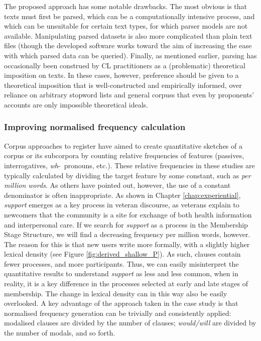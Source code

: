 The proposed approach has some notable drawbacks. The most obvious is that texts must first be parsed, which can be a computationally intensive process, and which can be unsuitable for certain text types, for which parser models are not available. Manipulating parsed datasets is also more complicated than plain text files (though the developed software works toward the aim of increasing the ease with which parsed data can be queried). Finally, as mentioned earlier, parsing has occasionally been construed by \gls{CL} practitioners as a (problematic) theoretical imposition on texts. In these cases, however, preference should be given to a theoretical imposition that is well\hyp{}constructed and empirically informed, over reliance on arbitrary stopword lists and general \glspl{corpus} that even by proponents' accounts \cite[e.g.][]{baker_acceptable_2012} are only impossible theoretical ideals.

\subsubsection{Improving normalised frequency calculation}


Corpus approaches to register \cite[including much of Biber's work, e.g.][]{biber_quantitative_2001,biber_register_2012} have aimed to create quantitative sketches of a \gls{corpus} or its subcorpora by counting relative frequencies of  features (passives, interrogatives, \emph{wh}\hyp{}~pronouns, etc.). These relative frequencies in these studies are typically calculated by dividing the target feature by some constant, such as \emph{per million words}. As others \cite[e.g.][]{evert2005statistics} have pointed out, however, the use of a constant denominator is often inappropriate. As shown in Chapter \ref{chap:experiential}, \emph{support} emerges as a key process in veteran discourse, as veterans explain to newcomers that the community is a site for exchange of both health information and interpersonal care. If we search for \emph{support} as a process in the Membership Stage Structure, we will find a decreasing frequency per million words, however. The reason for this is that new users write more formally, with a slightly higher lexical density (see Figure \ref{fig:derived_shallow_P}). As such, clauses contain fewer processes, and more participants. Thus, we can easily misinterpret the quantitative results to understand \emph{support} as less and less common, when in reality, it is a key difference in the processes selected at early and late stages of membership. The change in lexical density can in this way also be easily overlooked. A key advantage of the approach taken in the case study is that normalised frequency generation can be trivially and consistently applied: modalised clauses are divided by the number of clauses; \emph{would\slash will} are divided by the number of modals, and so forth.

